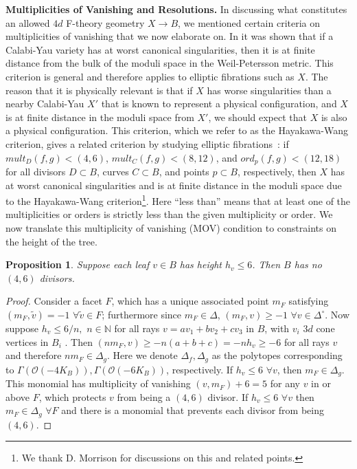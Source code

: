 \documentclass[aps,prl,twocolumn, superscriptaddress,groupedaddress,nofootinbib]{revtex4-1}
\newtheorem{prop}{Proposition}
\begin{document}
\vspace{.2cm}
\noindent \textbf{Multiplicities of Vanishing and Resolutions.}
In discussing what constitutes an allowed $4d$ F-theory geometry $X\to B$, we mentioned
certain criteria on multiplicities of vanishing that we now elaborate on. In 
\cite{Hayakawa,Wang} it was shown that if a Calabi-Yau variety has at worst
canonical singularities, then it is at finite distance 
from the bulk of the moduli space in the Weil-Petersson metric. 
This criterion is general and therefore applies to elliptic fibrations such as $X$.
The reason that it is physically relevant is that if $X$ has worse singularities
than a nearby Calabi-Yau $X'$ that is known to represent a physical configuration,
and $X$ is at finite distance in the moduli space from $X'$, we should expect that
$X$ is also a physical configuration. This criterion, which we refer to as the
Hayakawa-Wang criterion, gives a related criterion by studying elliptic
fibrations~\cite{Grassi1991, Candelas:2000nc, Morrisonunp}:
if $mult_D (f,g) < (4,6)$, $mult_C(f,g) < (8,12)$, and $ord_p(f,g) < (12,18)$ 
for all divisors $D\subset B$, curves $C\subset B$, and points $p\subset B$, respectively,
then  $X$ has at worst
canonical singularities and is at finite distance in the
moduli space due to the Hayakawa-Wang criterion\footnote{We thank D. Morrison for discussions on
this and related points.}. Here ``less than'' means that at least one of the multiplicities or orders is strictly less than the given multiplicity or order. 
 We now translate this multiplicity of vanishing (MOV) condition to constraints on the height of the tree.
\begin{prop}
\label{prop:heightcrit}
Suppose each leaf $v\in B$ has height $h_v\leq 6$. Then $B$ has
no $(4,6)$ divisors.
\end{prop}

\begin{proof}
Consider a facet
$F$, which has a unique associated point $m_F$ satisfying
$(m_F,\tilde v)=-1 \,\, \forall \tilde v \in F$; furthermore
since $m_F\in\Delta$, 
$(m_F,v)\geq -1\,\, \forall v\in\Delta^\circ$. Now
suppose $h_v \leq 6/n, \,\, n \in \mathbb{N}$  
for all rays $v=av_1 + b v_2 + c v_3$
in $B$, with $v_i$ $3d$ cone vertices in $B_i$ . Then 
$(nm_F, v)\geq -n(a+b+c)=-nh_v\geq -6$ for all rays $v$ and
therefore $nm_F \in \Delta_g$. Here we denote $\Delta_{f},\Delta_{g}$ as the polytopes corresponding to $\Gamma (\mathcal{O}(-4 K_B)),\Gamma (\mathcal{O}(-6 K_B))$, respectively. If $h_v\leq 6\,\, \forall v$, then $m_F\in\Delta_g$. This monomial has multiplicity of vanishing
$(v,m_F)+6=5$ for any $v$ in or above $F$, which protects
$v$ from being a $(4,6)$ divisor. If
$h_v\leq 6 \,\, \forall v$ then $m_F \in \Delta_g\,\, \forall F$
and there is a monomial that prevents
each divisor from being $(4,6)$.
\end{proof}
\end{document}
